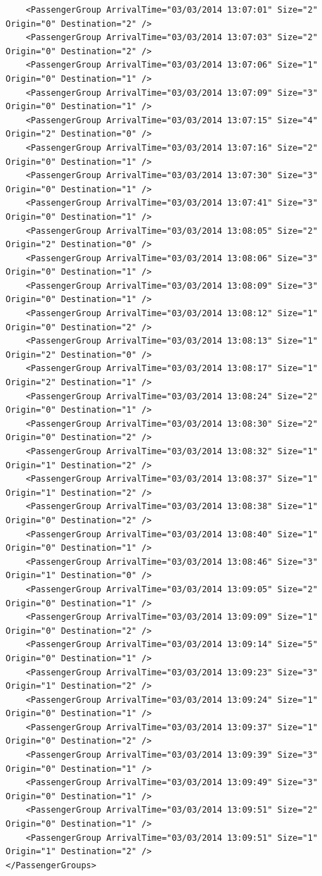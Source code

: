 \documentclass{UoYCSproject}
\begin{document}
\begin{lstlisting}
	<PassengerGroup ArrivalTime="03/03/2014 13:07:01" Size="2" Origin="0" Destination="2" />
	<PassengerGroup ArrivalTime="03/03/2014 13:07:03" Size="2" Origin="0" Destination="2" />
	<PassengerGroup ArrivalTime="03/03/2014 13:07:06" Size="1" Origin="0" Destination="1" />
	<PassengerGroup ArrivalTime="03/03/2014 13:07:09" Size="3" Origin="0" Destination="1" />
	<PassengerGroup ArrivalTime="03/03/2014 13:07:15" Size="4" Origin="2" Destination="0" />
	<PassengerGroup ArrivalTime="03/03/2014 13:07:16" Size="2" Origin="0" Destination="1" />
	<PassengerGroup ArrivalTime="03/03/2014 13:07:30" Size="3" Origin="0" Destination="1" />
	<PassengerGroup ArrivalTime="03/03/2014 13:07:41" Size="3" Origin="0" Destination="1" />
	<PassengerGroup ArrivalTime="03/03/2014 13:08:05" Size="2" Origin="2" Destination="0" />
	<PassengerGroup ArrivalTime="03/03/2014 13:08:06" Size="3" Origin="0" Destination="1" />
	<PassengerGroup ArrivalTime="03/03/2014 13:08:09" Size="3" Origin="0" Destination="1" />
	<PassengerGroup ArrivalTime="03/03/2014 13:08:12" Size="1" Origin="0" Destination="2" />
	<PassengerGroup ArrivalTime="03/03/2014 13:08:13" Size="1" Origin="2" Destination="0" />
	<PassengerGroup ArrivalTime="03/03/2014 13:08:17" Size="1" Origin="2" Destination="1" />
	<PassengerGroup ArrivalTime="03/03/2014 13:08:24" Size="2" Origin="0" Destination="1" />
	<PassengerGroup ArrivalTime="03/03/2014 13:08:30" Size="2" Origin="0" Destination="2" />
	<PassengerGroup ArrivalTime="03/03/2014 13:08:32" Size="1" Origin="1" Destination="2" />
	<PassengerGroup ArrivalTime="03/03/2014 13:08:37" Size="1" Origin="1" Destination="2" />
	<PassengerGroup ArrivalTime="03/03/2014 13:08:38" Size="1" Origin="0" Destination="2" />
	<PassengerGroup ArrivalTime="03/03/2014 13:08:40" Size="1" Origin="0" Destination="1" />
	<PassengerGroup ArrivalTime="03/03/2014 13:08:46" Size="3" Origin="1" Destination="0" />
	<PassengerGroup ArrivalTime="03/03/2014 13:09:05" Size="2" Origin="0" Destination="1" />
	<PassengerGroup ArrivalTime="03/03/2014 13:09:09" Size="1" Origin="0" Destination="2" />
	<PassengerGroup ArrivalTime="03/03/2014 13:09:14" Size="5" Origin="0" Destination="1" />
	<PassengerGroup ArrivalTime="03/03/2014 13:09:23" Size="3" Origin="1" Destination="2" />
	<PassengerGroup ArrivalTime="03/03/2014 13:09:24" Size="1" Origin="0" Destination="1" />
	<PassengerGroup ArrivalTime="03/03/2014 13:09:37" Size="1" Origin="0" Destination="2" />
	<PassengerGroup ArrivalTime="03/03/2014 13:09:39" Size="3" Origin="0" Destination="1" />
	<PassengerGroup ArrivalTime="03/03/2014 13:09:49" Size="3" Origin="0" Destination="1" />
	<PassengerGroup ArrivalTime="03/03/2014 13:09:51" Size="2" Origin="0" Destination="1" />
	<PassengerGroup ArrivalTime="03/03/2014 13:09:51" Size="1" Origin="1" Destination="2" />
</PassengerGroups>
\end{lstlisting}
\end{document}
